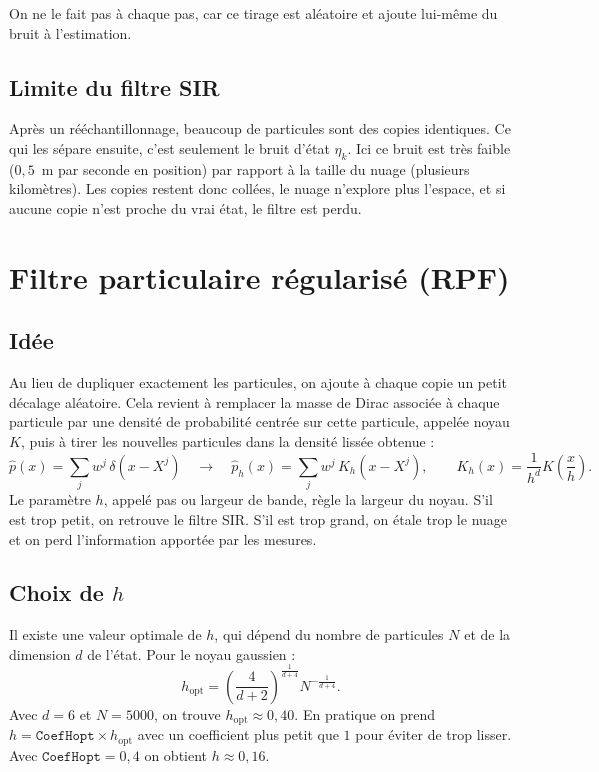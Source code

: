 \documentclass[11pt]{article}
\begin{document}
On ne le fait pas à chaque pas, car ce tirage est aléatoire et ajoute lui-même du
bruit à l'estimation.

\subsection{Limite du filtre SIR}

Après un rééchantillonnage, beaucoup de particules sont des copies identiques. Ce qui
les sépare ensuite, c'est seulement le bruit d'état $\eta_k$. Ici ce bruit est très
faible ($0{,}5$~m par seconde en position) par rapport à la taille du nuage (plusieurs
kilomètres). Les copies restent donc collées, le nuage n'explore plus l'espace, et si
aucune copie n'est proche du vrai état, le filtre est perdu.

\section{Filtre particulaire régularisé (RPF)}

\subsection{Idée}

Au lieu de dupliquer exactement les particules, on ajoute à chaque copie un petit
décalage aléatoire. Cela revient à remplacer la masse de Dirac associée à chaque
particule par une densité de probabilité centrée sur cette particule, appelée noyau
$K$, puis à tirer les nouvelles particules dans la densité lissée obtenue :
\begin{equation}
\hat p(x) = \sum_j w^j \, \delta(x - X^j)
\quad \longrightarrow \quad
\hat p_h(x) = \sum_j w^j \, K_h(x - X^j),
\qquad K_h(x) = \frac{1}{h^d} K\!\left(\frac{x}{h}\right).
\end{equation}
Le paramètre $h$, appelé pas ou largeur de bande, règle la largeur du noyau. S'il est trop petit, on retrouve le
filtre SIR. S'il est trop grand, on étale trop le nuage et on perd l'information
apportée par les mesures.

\subsection{Choix de $h$}

Il existe une valeur optimale de $h$, qui dépend du nombre de particules $N$ et
de la dimension $d$ de l'état. Pour le noyau gaussien :
\begin{equation}
h_{\mathrm{opt}} = \left( \frac{4}{d+2} \right)^{\frac{1}{d+4}} N^{-\frac{1}{d+4}} .
\end{equation}
Avec $d = 6$ et $N = 5000$, on trouve $h_{\mathrm{opt}} \approx 0{,}40$. En pratique on
prend $h = \texttt{CoefHopt} \times h_{\mathrm{opt}}$ avec un coefficient plus petit que
$1$ pour éviter de trop lisser. Avec $\texttt{CoefHopt} = 0{,}4$ on obtient $h \approx 0{,}16$.
\end{document}
